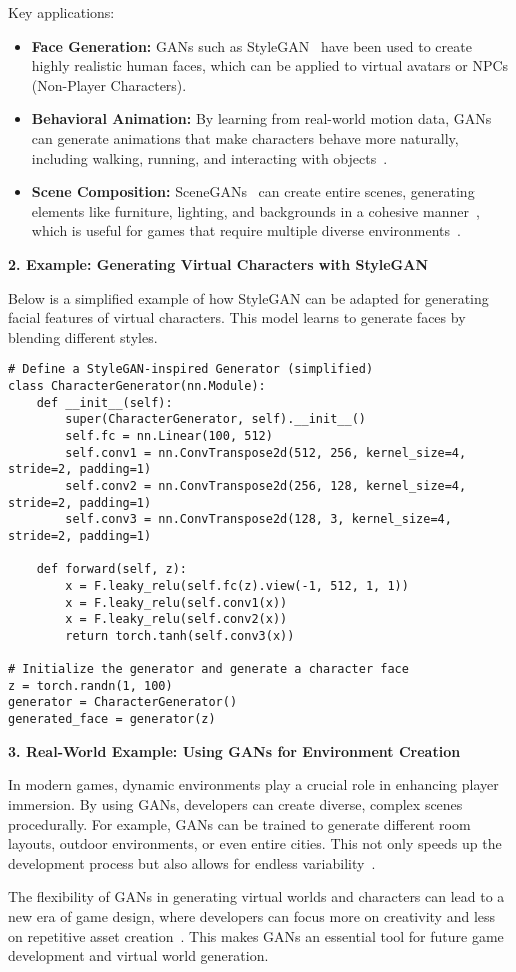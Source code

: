 Key applications:
\begin{itemize}
    \item \textbf{Face Generation:} GANs such as StyleGAN~\cite{karras2019style} have been used to create highly realistic human faces, which can be applied to virtual avatars or NPCs (Non-Player Characters).
    \item \textbf{Behavioral Animation:} By learning from real-world motion data, GANs can generate animations that make characters behave more naturally, including walking, running, and interacting with objects~\cite{gan2021research}.
    \item \textbf{Scene Composition:} SceneGANs~\cite{arad2021compositional} can create entire scenes, generating elements like furniture, lighting, and backgrounds in a cohesive manner~\cite{xu2017attngan}, which is useful for games that require multiple diverse environments~\cite{shim2022local}.
\end{itemize}

\textbf{2. Example: Generating Virtual Characters with StyleGAN}

Below is a simplified example of how StyleGAN can be adapted for generating facial features of virtual characters. This model learns to generate faces by blending different styles.

\begin{lstlisting}[style=python]
# Define a StyleGAN-inspired Generator (simplified)
class CharacterGenerator(nn.Module):
    def __init__(self):
        super(CharacterGenerator, self).__init__()
        self.fc = nn.Linear(100, 512)
        self.conv1 = nn.ConvTranspose2d(512, 256, kernel_size=4, stride=2, padding=1)
        self.conv2 = nn.ConvTranspose2d(256, 128, kernel_size=4, stride=2, padding=1)
        self.conv3 = nn.ConvTranspose2d(128, 3, kernel_size=4, stride=2, padding=1)
    
    def forward(self, z):
        x = F.leaky_relu(self.fc(z).view(-1, 512, 1, 1))
        x = F.leaky_relu(self.conv1(x))
        x = F.leaky_relu(self.conv2(x))
        return torch.tanh(self.conv3(x))

# Initialize the generator and generate a character face
z = torch.randn(1, 100)
generator = CharacterGenerator()
generated_face = generator(z)
\end{lstlisting}

\textbf{3. Real-World Example: Using GANs for Environment Creation}

In modern games, dynamic environments play a crucial role in enhancing player immersion. By using GANs, developers can create diverse, complex scenes procedurally. For example, GANs can be trained to generate different room layouts, outdoor environments, or even entire cities. This not only speeds up the development process but also allows for endless variability~\cite{arad2021compositional}.

The flexibility of GANs in generating virtual worlds and characters can lead to a new era of game design, where developers can focus more on creativity and less on repetitive asset creation~\cite{wang2020attentive}. This makes GANs an essential tool for future game development and virtual world generation.
